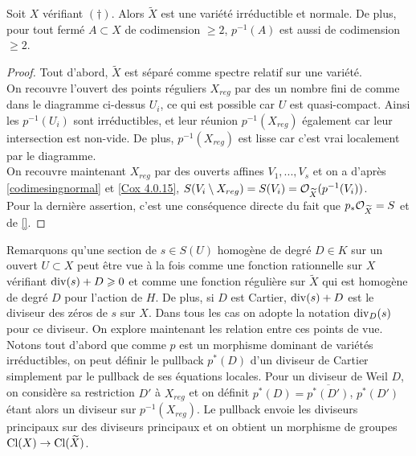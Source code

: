 \begin{prop}
Soit $X$ vérifiant $(\dagger)$. Alors $\widetilde{X}$ est une variété irréductible et normale. De plus, pour tout fermé $A\subset X$ de codimension $\geq 2$, $p^{-1}(A)$ est aussi de codimension $\geq 2$.
\end{prop}
\begin{proof}
Tout d'abord, $\widetilde{X}$ est séparé comme spectre relatif sur une variété.\\
On recouvre l'ouvert des points réguliers $X_{reg}$ par des un nombre fini de comme dans le diagramme ci-dessus $U_i$, ce qui est possible car $U$ est quasi-compact. Ainsi les $p^{-1}(U_i)$ sont irréductibles, et leur réunion $p^{-1}(X_{reg})$ également car leur intersection est non-vide. De plus, $p^{-1}(X_{reg})$ est lisse car c'est vrai localement par le diagramme.\\
On recouvre maintenant $X_{reg}$ par des ouverts affines $V_1,...,V_s$ et on a d'après \ref{codimesingnormal} et \ref{Cox 4.0.15}, $S(V_i\setminus X_{reg})=S(V_i)=\mathcal{O}_{\widetilde{X}}(p^{-1}(V_i))$.\\
Pour la dernière assertion, c'est une conséquence directe du fait que $p_*\mathcal{O}_{\widetilde{X}}=S$ et de \ref{}.
\end{proof}

Remarquons qu'une section de $s\in S(U)$ homogène de degré $D\in K$ sur un ouvert $U\subset X$ peut être vue à la fois comme une fonction rationnelle sur $X$ vérifiant $\operatorname{div}(s)+D\geqslant 0$ et comme une fonction régulière sur $\widetilde{X}$ qui est homogène de degré $D$ pour l'action de $H$. De plus, si $D$ est Cartier, $\operatorname{div}(s)+D$ est le diviseur des zéros de $s$ sur $X$. Dans tous les cas on adopte la notation $\operatorname{div}_D(s)$ pour ce diviseur. On explore maintenant les relation entre ces points de vue. Notons tout d'abord que comme $p$ est un morphisme dominant de variétés irréductibles, on peut définir le pullback $p^*(D)$ d'un diviseur de Cartier simplement par le pullback de ses équations locales. Pour un diviseur de Weil $D$, on considère sa restriction $D'$ à $X_{reg}$ et on définit $p^*(D)=\overline{p^*(D')}$, $p^*(D')$ étant alors un diviseur sur $p^{-1}(X_{reg})$. Le pullback envoie les diviseurs principaux sur des diviseurs principaux et on obtient un morphisme de groupes $\operatorname{Cl}(X)\rightarrow \operatorname{Cl}(\widetilde{X})$.

